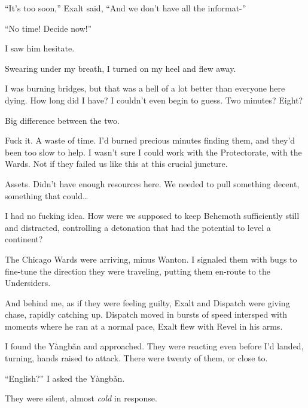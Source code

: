 ``It's too soon,'' Exalt said, ``And we don't have all the informat-''



``No time!  Decide now!''



I saw him hesitate.



Swearing under my breath, I turned on my heel and flew away.



I was burning bridges, but that was a hell of a lot better than everyone here dying.  How long did I have?  I couldn't even begin to guess.  Two minutes?  Eight?



Big difference between the two.



Fuck it.  A waste of time.  I'd burned precious minutes finding them, and they'd been too slow to help.  I wasn't sure I could work with the Protectorate, with the Wards.  Not if they failed us like this at this crucial juncture.



Assets.  Didn't have enough resources here.  We needed to pull something decent, something that could\ldots



I had no fucking idea.  How were we supposed to keep Behemoth sufficiently still and distracted, controlling a detonation that had the potential to level a continent?



The Chicago Wards were arriving, minus Wanton.  I signaled them with bugs to fine-tune the direction they were traveling, putting them en-route to the Undersiders.



And behind me, as if they were feeling guilty, Exalt and Dispatch were giving chase, rapidly catching up.  Dispatch moved in bursts of speed intersped with moments where he ran at a normal pace, Exalt flew with Revel in his arms.



I found the Y\`{a}ngb\v{a}n and approached.  They were reacting even before I'd landed, turning, hands raised to attack.  There were twenty of them, or close to.



``English?'' I asked the Y\`{a}ngb\v{a}n.



They were silent, almost \emph{cold} in response.



